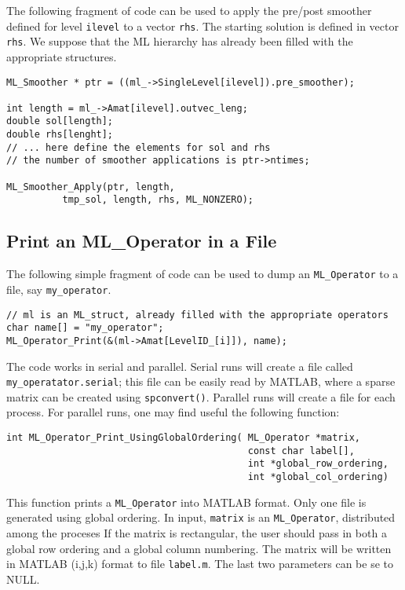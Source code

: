 \documentclass[10pt,letter,relax]{SANDreport}
\begin{document}
The following fragment of code can be used to apply the pre/post smoother
defined for level \verb!ilevel! to a vector \verb!rhs!. The starting solution
is defined in vector \verb!rhs!. We suppose that the ML hierarchy has already
been filled with the appropriate structures.
\begin{verbatim}
ML_Smoother * ptr = ((ml_->SingleLevel[ilevel]).pre_smoother);

int length = ml_->Amat[ilevel].outvec_leng;
double sol[length];
double rhs[lenght];
// ... here define the elements for sol and rhs
// the number of smoother applications is ptr->ntimes;

ML_Smoother_Apply(ptr, length,
		  tmp_sol, length, rhs, ML_NONZERO);
\end{verbatim}

\subsection{Print an ML\_Operator in a File}

The following simple fragment of code can be used to dump an
\verb!ML_Operator! to a file, say \verb!my_operator!.
\begin{verbatim}
// ml is an ML_struct, already filled with the appropriate operators
char name[] = "my_operator";
ML_Operator_Print(&(ml->Amat[LevelID_[i]]), name);
\end{verbatim}
The code works in serial and parallel. Serial runs will create a file called
\verb!my_operatator.serial!; this file can be easily read by MATLAB, where a
sparse matrix can be created using \verb!spconvert()!. Parallel runs will
create a file for each process. For parallel runs, one may find useful the
following function:
\begin{verbatim}
int ML_Operator_Print_UsingGlobalOrdering( ML_Operator *matrix,
                                           const char label[],
                                           int *global_row_ordering,
                                           int *global_col_ordering)
\end{verbatim}
This function prints a \verb!ML_Operator! into MATLAB format. Only one file is generated using global ordering. 
In input, \verb!matrix! is an \verb!ML_Operator!, distributed among the proceses     
If the matrix is rectangular, the user should   pass in both a global row
ordering and a global column numbering. The
matrix will be written in MATLAB (i,j,k) format to file \verb!label.m!. The
last two parameters can be se to NULL.
\end{document}
